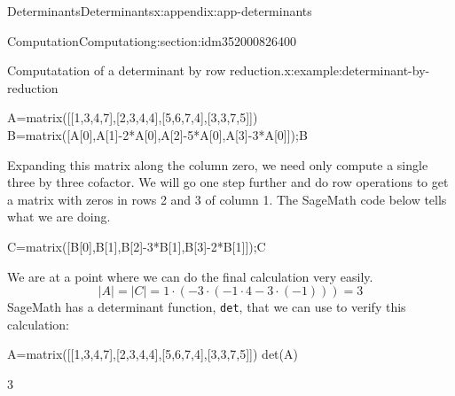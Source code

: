 \documentclass[oneside,10pt,]{book}
\newcommand{\mono}[1]{\texttt{#1}}
\begin{document}
\begin{appendixptx}{Determinants}{}{Determinants}{}{}{x:appendix:app-determinants}
\begin{sectionptx}{Computation}{}{Computation}{}{}{g:section:idm352000826400}
\begin{example}{Computatation of a determinant by row reduction.}{x:example:determinant-by-reduction}
\begin{sageinput}
A=matrix([[1,3,4,7],[2,3,4,4],[5,6,7,4],[3,3,7,5]])
B=matrix([A[0],A[1]-2*A[0],A[2]-5*A[0],A[3]-3*A[0]]);B
\end{sageinput}
\begin{sageoutput}
[  1   3   4   7]
[  0  -3  -4 -10]
[  0  -9 -13 -31]
[  0  -6  -5 -16]
\end{sageoutput}
Expanding this matrix along the column zero, we need only compute a single three by three cofactor.  We will go one step further and do row operations to get a matrix with zeros in rows 2 and 3 of column 1.  The SageMath code below tells what we are doing.%
\begin{sageinput}
C=matrix([B[0],B[1],B[2]-3*B[1],B[3]-2*B[1]]);C
\end{sageinput}
\begin{sageoutput}
[  1   3   4   7]
[  0  -3  -4 -10]
[  0   0  -1  -1]
[  0   0   3   4]
\end{sageoutput}
We are at a point where we can do the final calculation very easily.%
\begin{equation*}
\lvert A \rvert = \lvert C \rvert = 1 \cdot(-3 \cdot (-1\cdot 4 - 3\cdot (-1)))= 3
\end{equation*}
SageMath has a determinant function, \mono{det}, that we can use to verify this calculation:%
\begin{sageinput}
A=matrix([[1,3,4,7],[2,3,4,4],[5,6,7,4],[3,3,7,5]])
det(A)
\end{sageinput}
\begin{sageoutput}
3
\end{sageoutput}
\end{example}
\end{sectionptx}
\end{appendixptx}
%
%
\typeout{************************************************}
\typeout{************************************************}
%
\end{document}

